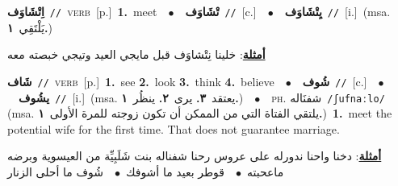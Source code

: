 \documentclass[10pt,a4paper,twoside]{article} %
\begin{document}
\begin{multicols}{2}
{\setlength\topsep{0pt}\textbf{\foreignlanguage{arabic}{اِتْشَاوَف}}\ {\color{gray}\texttt{//}\color{black}}\ \textsc{verb}\ [p.]\ \textbf{1.}~meet\ \ $\bullet$\ \ \setlength\topsep{0pt}\textbf{\foreignlanguage{arabic}{تْشَاوَف}}\ {\color{gray}\texttt{//}\color{black}}\ [c.]\ \ $\bullet$\ \ \setlength\topsep{0pt}\textbf{\foreignlanguage{arabic}{يِتْشَاوَف}}\ {\color{gray}\texttt{//}\color{black}}\ [i.]\ \color{gray}(msa. \foreignlanguage{arabic}{يَلْتَقِي}~\foreignlanguage{arabic}{\textbf{١.}})\color{black}\  \begin{flushright}\color{gray}\foreignlanguage{arabic}{\textbf{\underline{\foreignlanguage{arabic}{أمثلة}}}: خلينا نِتْشاوَف قبل مايجي العيد وتيجي خبصته معه}\end{flushright}\color{black}} \vspace{2mm}

{\setlength\topsep{0pt}\textbf{\foreignlanguage{arabic}{شَاف}}\ {\color{gray}\texttt{//}\color{black}}\ \textsc{verb}\ [p.]\ \textbf{1.}~see  \textbf{2.}~look  \textbf{3.}~think  \textbf{4.}~believe\ \ $\bullet$\ \ \setlength\topsep{0pt}\textbf{\foreignlanguage{arabic}{شُوف}}\ {\color{gray}\texttt{//}\color{black}}\ [c.]\ \ $\bullet$\ \ \setlength\topsep{0pt}\textbf{\foreignlanguage{arabic}{يشُوف}}\ {\color{gray}\texttt{//}\color{black}}\ [i.]\ \color{gray}(msa. \foreignlanguage{arabic}{يعتقد}~\foreignlanguage{arabic}{\textbf{٣.}}  \foreignlanguage{arabic}{يرى}~\foreignlanguage{arabic}{\textbf{٢.}}  \foreignlanguage{arabic}{ينظُر}~\foreignlanguage{arabic}{\textbf{١.}})\color{black}\ \ $\bullet$\ \ \textsc{ph.} \color{gray} \foreignlanguage{arabic}{شفنَاله}\color{black}\ {\color{gray}\texttt{/{\sffamily ʃufnaːlo}/}\color{black}}\ \color{gray} (msa. \foreignlanguage{arabic}{يلتقي الفتاة التي من الممكن أن تكون زوجته للمرة الأولى}~\foreignlanguage{arabic}{\textbf{١.}})\color{black}\ \textbf{1.}~meet the potential wife for the first time. That does not guarantee marriage.\  \begin{flushright}\color{gray}\foreignlanguage{arabic}{\textbf{\underline{\foreignlanguage{arabic}{أمثلة}}}: دخنا واحنا ندورله على عروس رحنا شفناله بنت شَلَبِيِّة من العيسوية وبرضه ماعحبته\ $\bullet$\ \  قوطر بعيد ما أشوفك\ $\bullet$\ \  شُوف ما أحلى الزنار}\end{flushright}\color{black}} \vspace{2mm}


\end{multicols}
\end{document}
